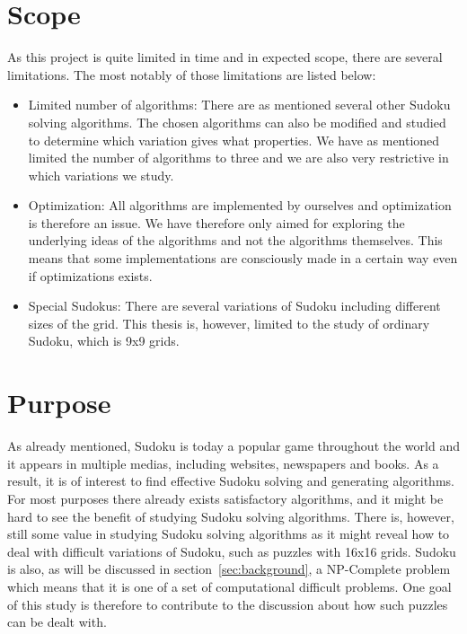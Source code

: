 \documentclass[a4paper,11pt]{kth-mag}
\begin{document}
\FloatBarrier
\section{Scope}
As this project is quite limited in time and in expected scope, 
there are several limitations. The most notably of those limitations are listed below: 
\begin{itemize}
    \item Limited number of algorithms:
There are as mentioned several other Sudoku solving algorithms. The chosen algorithms can also be modified and studied to determine which variation gives what properties. We have as mentioned limited the number of algorithms to three and we are also very restrictive in which variations we study.  
    \item Optimization: 
All algorithms are implemented by ourselves and optimization is therefore an issue. 
We have therefore only aimed for exploring the underlying ideas of the algorithms and not the algorithms themselves.
This means that some implementations are consciously made in a certain way even if optimizations exists.

    \item Special Sudokus: There are several variations of Sudoku including different sizes of the grid.
This thesis is, however, limited to the study of ordinary Sudoku, which is 9x9 grids.
\end{itemize}

\FloatBarrier
\section{Purpose}
As already mentioned, Sudoku is today a popular game throughout the world and it appears in multiple medias, including websites, newspapers and books. 
As a result, it is of interest to find effective Sudoku solving and generating algorithms. 
For most purposes there already exists satisfactory algorithms, and it might be hard to see the benefit of studying Sudoku solving algorithms. 
There is, however, still some value in studying Sudoku solving algorithms as it might reveal how to deal with difficult variations of Sudoku, such as puzzles with 16x16 grids. 
Sudoku is also, as will be discussed in section~\ref{sec:background}, a NP-Complete problem which means that it is one of a set of computational difficult problems.\cite{complexity} 
One goal of this study is therefore to contribute to the discussion about how such puzzles can be dealt with. 
\end{document}
